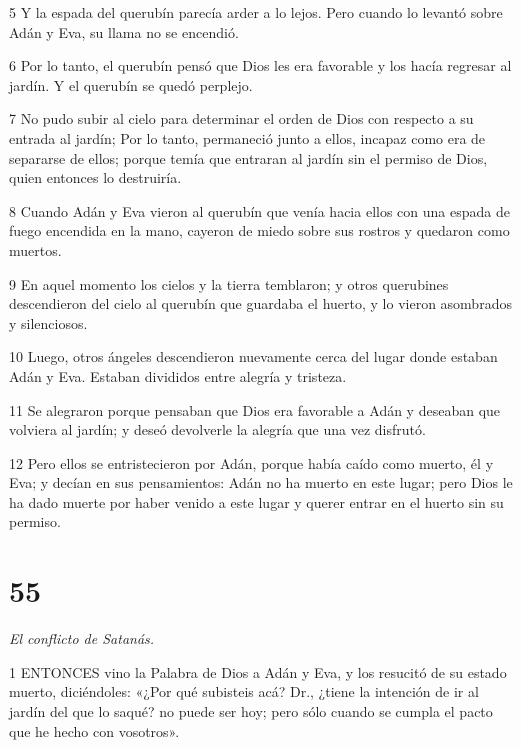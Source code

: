 \par 5 Y la espada del querubín parecía arder a lo lejos. Pero cuando lo levantó sobre Adán y Eva, su llama no se encendió.

\par 6 Por lo tanto, el querubín pensó que Dios les era favorable y los hacía regresar al jardín. Y el querubín se quedó perplejo.

\par 7 No pudo subir al cielo para determinar el orden de Dios con respecto a su entrada al jardín; Por lo tanto, permaneció junto a ellos, incapaz como era de separarse de ellos; porque temía que entraran al jardín sin el permiso de Dios, quien entonces lo destruiría.

\par 8 Cuando Adán y Eva vieron al querubín que venía hacia ellos con una espada de fuego encendida en la mano, cayeron de miedo sobre sus rostros y quedaron como muertos.

\par 9 En aquel momento los cielos y la tierra temblaron; y otros querubines descendieron del cielo al querubín que guardaba el huerto, y lo vieron asombrados y silenciosos.

\par 10 Luego, otros ángeles descendieron nuevamente cerca del lugar donde estaban Adán y Eva. Estaban divididos entre alegría y tristeza.

\par 11 Se alegraron porque pensaban que Dios era favorable a Adán y deseaban que volviera al jardín; y deseó devolverle la alegría que una vez disfrutó.

\par 12 Pero ellos se entristecieron por Adán, porque había caído como muerto, él y Eva; y decían en sus pensamientos: Adán no ha muerto en este lugar; pero Dios le ha dado muerte por haber venido a este lugar y querer entrar en el huerto sin su permiso.



\chapter{55}

\par \textit{El conflicto de Satanás.}

\par 1 ENTONCES vino la Palabra de Dios a Adán y Eva, y los resucitó de su estado muerto, diciéndoles: «¿Por qué subisteis acá? Dr., ¿tiene la intención de ir al jardín del que lo saqué? no puede ser hoy; pero sólo cuando se cumpla el pacto que he hecho con vosotros».


